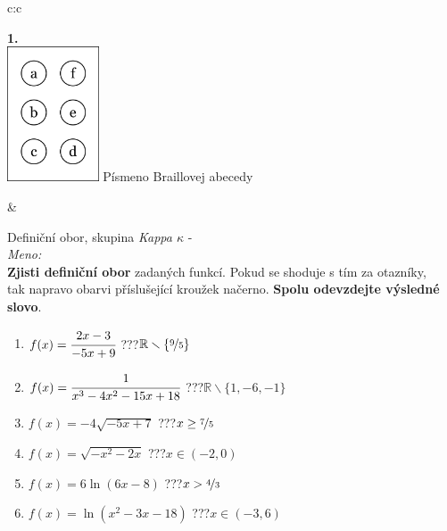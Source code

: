 \documentclass[10pt]{report}
\begin{document}
\begin{tabular}{c:c}
\begin{minipage}[c][99mm][t]{0.49\linewidth}
\begin{center}
\begin{minipage}{0.20\linewidth}
\begin{center}
{\Huge\bfseries 1.} \\[2mm]
\includegraphics[height=40mm]{../images/braille.png}
{\small Písmeno Braillovej abecedy}
\end{center}
\end{minipage}
\end{center}
\end{minipage}
&
\begin{minipage}[c][99mm][t]{0.49\linewidth}
\begin{center}
\vspace{7mm}
{\huge Definiční obor, skupina \textit{Kappa $\kappa$} -}\\[4.5mm]
\textit{Meno:}\phantom{xxxxxxxxxxxxxxxxxxxxxxxxxxxxxxxxxxxxxxxxxxxxxxxxxxxxxxxxxxxxxxxxx}\\[3.5mm]
\textbf{Zjisti definiční obor} zadaných funkcí. Pokud se shoduje s tím za otazníky,\\tak napravo obarvi příslušející kroužek načerno. \textbf{Spolu odevzdejte výsledné slovo}.\\[3mm]
\begin{minipage}{0.77\linewidth}
\begin{center}
\begin{varwidth}{\textwidth}
\begin{enumerate}
\normalsize
\item $f(x)=\cfrac{2x-3}{-5x+9}$\quad \dotfill\; ???\;\dotfill \quad $\mathbb{R}\smallsetminus\{\nicefrac{9}{5}\}$
\item $f(x)=\cfrac{1}{x^3-4x^2-15x+18}$\quad \dotfill\; ???\;\dotfill \quad $\mathbb{R}\smallsetminus\{1,-6,-1\}$
\item $f(x)=-4\sqrt{-5x+7}$\quad \dotfill\; ???\;\dotfill \quad $x\geq\nicefrac{7}{5}$
\item $f(x)=\sqrt{-x^2-2x}$\quad \dotfill\; ???\;\dotfill \quad $x\in(-2 , 0)$
\item $f(x)=6\ln{(6x-8)}$\quad \dotfill\; ???\;\dotfill \quad $x>\nicefrac{4}{3}$
\item $f(x)=\ln{(x^2-3x-18)}$\quad \dotfill\; ???\;\dotfill \quad $x\in(-3 , 6)$

\end{enumerate}
\end{varwidth}
\end{center}
\end{minipage}
\end{center}
\end{minipage}
\end{tabular}
\end{document}
